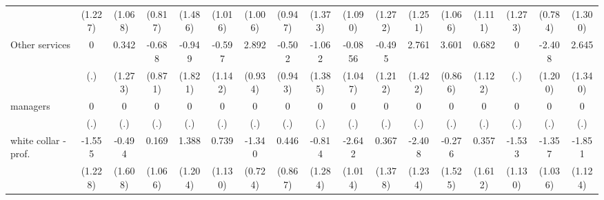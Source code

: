 {\begin{tabular}{l*{16}{c}}
                    &     (1.227)         &     (1.068)         &     (0.817)         &     (1.486)         &     (1.016)         &     (1.006)         &     (0.947)         &     (1.373)         &     (1.090)         &     (1.272)         &     (1.251)         &     (1.066)         &     (1.111)         &     (1.273)         &     (0.784)         &     (1.300)         \\
[1em]
Other services      &           0         &       0.342         &      -0.688         &      -0.949         &      -0.597         &       2.892\sym{**} &      -0.502         &      -1.062         &     -0.0856         &      -0.495         &       2.761         &       3.601\sym{***}&       0.682         &           0         &      -2.408\sym{*}  &       2.645\sym{*}  \\
                    &         (.)         &     (1.273)         &     (0.871)         &     (1.821)         &     (1.142)         &     (0.934)         &     (0.943)         &     (1.385)         &     (1.047)         &     (1.212)         &     (1.422)         &     (0.866)         &     (1.122)         &         (.)         &     (1.200)         &     (1.340)         \\
[1em]
managers            &           0         &           0         &           0         &           0         &           0         &           0         &           0         &           0         &           0         &           0         &           0         &           0         &           0         &           0         &           0         &           0         \\
                    &         (.)         &         (.)         &         (.)         &         (.)         &         (.)         &         (.)         &         (.)         &         (.)         &         (.)         &         (.)         &         (.)         &         (.)         &         (.)         &         (.)         &         (.)         &         (.)         \\
[1em]
white collar - prof.&      -1.555         &      -0.494         &       0.169         &       1.388         &       0.739         &      -1.340         &       0.446         &      -0.814         &      -2.642\sym{**} &       0.367         &      -2.408         &      -0.276         &       0.357         &      -1.533         &      -1.357         &      -1.851         \\
                    &     (1.228)         &     (1.608)         &     (1.066)         &     (1.204)         &     (1.130)         &     (0.724)         &     (0.867)         &     (1.284)         &     (1.014)         &     (1.378)         &     (1.234)         &     (1.525)         &     (1.612)         &     (1.130)         &     (1.036)         &     (1.124)         \\

\end{tabular}}
